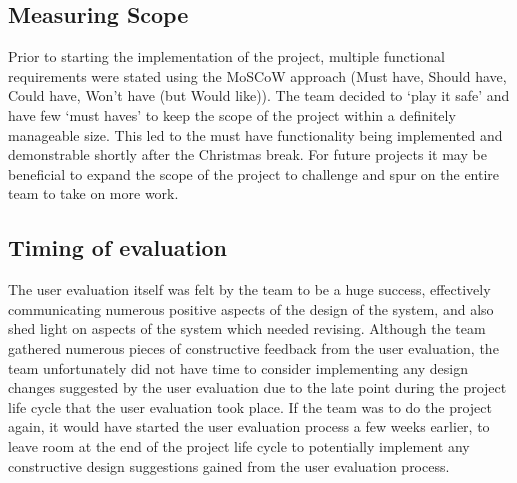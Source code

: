 \subsection{Measuring Scope}

Prior to starting the implementation of the project, multiple functional
requirements were stated using the MoSCoW approach (Must have, Should have,
Could have, Won't have (but Would like)). The team decided to `play it safe' and
have few `must haves' to keep the scope of the project within a definitely
manageable size. This led to the must have functionality being implemented and
demonstrable shortly after the Christmas break. For future projects it may be
beneficial to expand the scope of the project to challenge and spur on the
entire team to take on more work.

\subsection{Timing of evaluation}

The user evaluation itself was felt by the team to be a huge success,
effectively communicating numerous positive aspects of the design of the system,
and also shed light on aspects of the system which needed revising. Although the
team gathered numerous pieces of constructive feedback from the user evaluation,
the team unfortunately did not have time to consider implementing any design
changes suggested by the user evaluation due to the late point during the
project life cycle that the user evaluation took place. If the team was to do
the project again, it would have started the user evaluation process a few weeks
earlier, to leave room at the end of the project life cycle to potentially
implement any constructive design suggestions gained from the user evaluation
process.
